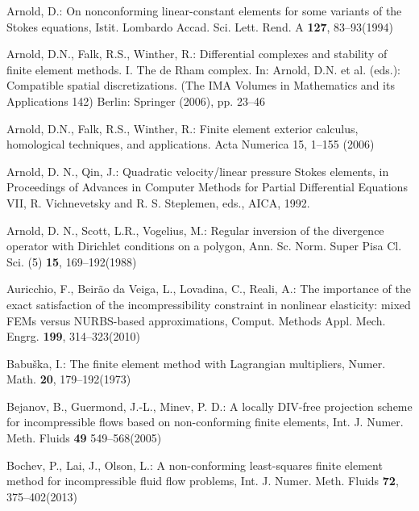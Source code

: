 \documentclass[12pt,showkeys]{amsart}
\begin{document}
\begin{thebibliography}{000}

\newblock Arnold, D.:
\rm{On nonconforming linear-constant elements for some variants of the Stokes equations}, Istit. Lombardo Accad. Sci. Lett. Rend. A \textbf{127}, 83--93(1994)

\newblock Arnold, D.N., Falk, R.S., Winther, R.:
\rm{Differential complexes and stability of finite
element methods. I. The de Rham complex}. In: Arnold, D.N. et al. (eds.): Compatible
spatial discretizations. (The IMA Volumes in Mathematics and its Applications 142)
Berlin: Springer (2006), pp. 23--46

\newblock Arnold, D.N., Falk, R.S., Winther, R.: 
\rm{Finite element exterior calculus, homological
techniques, and applications}. Acta Numerica 15, 1--155 (2006)

\newblock Arnold, D. N., Qin, J.: 
\rm{Quadratic velocity/linear pressure Stokes elements}, in Proceedings of Advances in Computer Methods for Partial Differential Equations VII, R. Vichnevetsky and R. S. Steplemen, eds., AICA, 1992.

\newblock Arnold, D. N., Scott, L.R., Vogelius, M.:
\rm{Regular inversion of the divergence operator with Dirichlet conditions on a polygon}, Ann. Sc. Norm. Super Pisa Cl. Sci. (5) \textbf{15}, 169--192(1988) 

\newblock Auricchio, F., Beir\~ao da Veiga, L., Lovadina, C., Reali, A.:
\rm{The importance of the exact satisfaction of the incompressibility constraint in nonlinear elasticity: mixed FEMs versus NURBS-based approximations}, Comput. Methods Appl. Mech. Engrg. \textbf{199}, 314--323(2010)

\newblock Babu\v{s}ka, I.:
\rm{The finite element method with Lagrangian multipliers}, Numer. Math. \textbf{20}, 179--192(1973)

\newblock Bejanov, B., Guermond, J.-L., Minev, P. D.:
\rm{A locally DIV-free projection scheme for incompressible flows based on non-conforming finite elements}, Int. J. Numer. Meth. Fluids \textbf{49} 549--568(2005)

\newblock Bochev, P., Lai, J., Olson, L.:
\rm{A non-conforming least-squares finite element method for
incompressible fluid flow problems}, Int. J. Numer. Meth. Fluids \textbf{72}, 375--402(2013)


\end{thebibliography}
\end{document}
